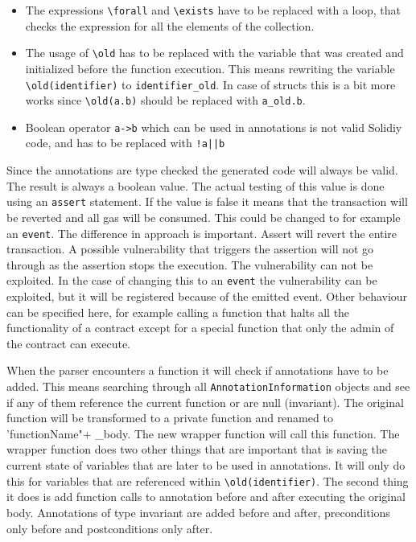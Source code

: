 \documentclass[a4paper]{article}
\begin{document}
\begin{itemize}
  \item The expressions \texttt{\textbackslash forall} and \texttt{\textbackslash exists} have to be replaced with a loop, that checks the expression for all the elements of the collection. 
  \item The usage of \texttt{\textbackslash old} has to be replaced with the variable that was created and initialized before the function execution. This means rewriting the variable \texttt{\textbackslash old(identifier)} to \texttt{identifier\_old}. In case of structs this is a bit more works since \texttt{\textbackslash old(a.b)} should be replaced with \texttt{a\_old.b}.
  \item Boolean operator \texttt{a->b} which can be used in annotations is not valid Solidiy code, and has to be replaced with \texttt{!a||b}
\end{itemize}
Since the annotations are type checked the generated code will always be valid. The result is always a boolean value. The actual testing of this value is done using an \texttt{assert} statement. If the value is false it means that the transaction will be reverted and all gas will be consumed. This could be changed to for example an \texttt{event}. The difference in approach is important. Assert will revert the entire transaction. A possible vulnerability that triggers the assertion will not go through as the assertion stops the execution. The vulnerability can not be exploited. In the case of changing this to an \texttt{event} the vulnerability can be exploited, but it will be registered because of the emitted event. Other behaviour can be specified here, for example calling a function that halts all the functionality of a contract except for a special function that only the admin of the contract can execute.\par
When the parser encounters a function it will check if annotations have to be added. This means searching through all \texttt{AnnotationInformation} objects and see if any of them reference the current function or are null (invariant). The original function will be transformed to a private function and renamed to 'functionName"+ \_body. The new wrapper function will call this function. The wrapper function does two other things that are important that is saving the current state of variables that are later to be used in annotations. It will only do this for variables that are referenced within \texttt{\textbackslash old(identifier)}. The second thing it does is add function calls to annotation before and after executing the original body. Annotations of type invariant are added before and after, preconditions only before and postconditions only after. \par
\end{document}
